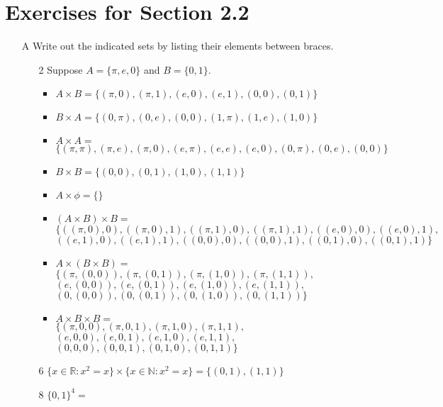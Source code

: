 \documentclass[12pt]{article}
\begin{document}
\section*{Exercises for Section 2.2}
\begin{itemize}
    \item [A] Write out the indicated sets by listing their elements between braces.
	\begin{itemize}
	    \item [2] Suppose $A=\{\pi, e, 0\}$ and $B=\{0,1\}$.
		\begin{itemize}
		    \item $A \times B = \{(\pi, 0), (\pi, 1), (e, 0), (e, 1), (0, 0), (0, 1)\}$
		    \item $B \times A = \{(0, \pi),(0, e), (0, 0), (1, \pi), (1, e), (1, 0)\}$
		    \item $A \times A = $\\
		    $\{(\pi, \pi), (\pi, e), (\pi, 0), (e, \pi), (e, e), (e, 0), (0, \pi), (0, e), (0, 0)\}$
		    \item $B \times B = \{ (0, 0), (0, 1), (1, 0), (1, 1)\}$
		    \item $A \times \phi = \{\}$
		    \item $(A \times B) \times B = $\\
		    $\{((\pi, 0), 0), ((\pi, 0), 1), ((\pi, 1), 0), ((\pi, 1), 1), ((e, 0), 0), ((e, 0), 1),$\\
		    $((e, 1), 0), ((e, 1), 1), ((0, 0), 0), ((0, 0), 1), ((0, 1), 0), ((0, 1), 1)\}$
		    \item $A \times (B \times B) = $\\
		    $\{ (\pi,(0, 0)), (\pi, (0, 1)), (\pi, (1, 0)), (\pi,(1, 1)),$\\
		    $(e,(0, 0)), (e, (0, 1)), (e, (1, 0)), (e,(1, 1)),$\\
		    $(0,(0, 0)), (0, (0, 1)), (0, (1, 0)), (0,(1, 1))\}$
		    \item $A \times B \times B =$\\
			$\{(\pi, 0, 0), (\pi, 0, 1), (\pi, 1, 0), (\pi, 1, 1),$\\
			$(e, 0, 0), (e, 0, 1), (e, 1, 0), (e, 1, 1),$\\
			$(0, 0, 0), (0, 0, 1), (0, 1, 0), (0, 1, 1)\}$
		\end{itemize}
	    \item [6] $\{x \in \mathbb{R} : x^2 = x\} \times \{x \in \mathbb{N} : x^2 = x\} = \{(0, 1), (1, 1)\}$
	    \item [8] $\{0, 1 \}^4 =$\\

\end{itemize}
\end{itemize}
\end{document}
